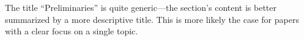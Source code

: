


\noindent
The title ``Preliminaries'' is quite generic---the section's content is better summarized by a more descriptive title.
This is more likely the case for papers with a clear focus on a single topic.
